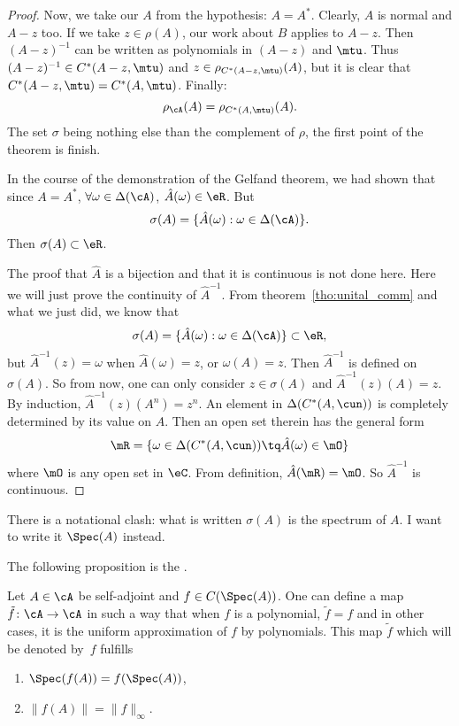 \begin{proof}
	Now, we take our $A$ from the hypothesis: $A=A^*$. Clearly, $A$ is normal and $A-z$ too. If we take $z\in\rho(A)$, our work about $B$ applies to $A-z$. Then $(A-z)^{-1}$ can be written as polynomials in $(A-z)$ and $\mtu$. Thus $(A-z)^{-1}\in C^*(A-z,\mtu)$ and
	$z\in\rho_{C^*(A-z,\mtu)}(A)$, but it is clear that $C^*(A-z,\mtu)=C^*(A,\mtu)$. Finally:
	\[
		\rho_{\cA}(A)=\rho_{C^*(A,\mtu)}(A).
	\]
	The set $\sigma$ being nothing else than the complement of $\rho$, the first point of the theorem is finish.

	In the course of the demonstration of the Gelfand theorem, we had shown that since $A=A^*$, $\forall\omega\in\Delta(\cA)$, $\hat A(\omega)\in\eR$. But
	\[
		\sigma(A)=\{\hat A(\omega):\omega\in\Delta(\cA)\}.
	\]
	Then $\sigma(A)\subset\eR$.

	The proof that $\hat A$ is a bijection and that it is continuous is not done here. Here we will just prove the continuity of $\hat A^{-1}$. From theorem~\ref{tho:unital_comm} and what we just did, we know that
	\[
		\sigma(A)=\{\hat A(\omega):\omega\in\Delta(\cA)\}\subset\eR,
	\]
	but $\hat A^{-1}(z)=\omega$ when $\hat A(\omega)=z$, or $\omega(A)=z$. Then $\hat A^{-1}$ is defined on $\sigma(A)$. So from now, one can only consider $z\in\sigma(A)$ and $\hat A^{-1}(z)(A)=z$. By induction, $\hat A^{-1}(z)(A^n)=z^n$. An element in $\Delta(C^*(A,\cun))$ is completely determined by its value on $A$. Then an open set therein has the general form
	\[
		\mR=\{ \omega\in\Delta(C^*(A,\cun))\tq\hat A(\omega)\in\mO \}
	\]
	where $\mO$ is any open set in $\eC$. From definition, $\hat A(\mR)=\mO$. So $\hat A^{-1}$ is continuous.

\end{proof}


\begin{probleme}
	There is a notational clash: what is written $\sigma(A)$ is the spectrum of $A$. I want to write it $\Spec(A)$ instead.
\end{probleme}

The following proposition is the .
\begin{theorem}     \label{ThoContFuncCalculus}
	Let $A\in\cA$ be self-adjoint and $f\in C(\Spec(A))$. One can define a map $\tilde f\colon \cA\to \cA$ in such a way that when $f$ is a polynomial, $\tilde f=f$ and in other cases, it is the uniform approximation of $f$ by polynomials. This map $\tilde f$ which will be denoted by~$f$ fulfills
	\begin{enumerate}
		\item $\Spec(f(A))=f(\Spec(A))$,  \label{enuji}
		\item $\|f(A)\|=\|f\|_{\infty}$.
	\end{enumerate}\label{prop:cont_calc}
\end{theorem}

